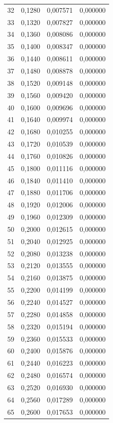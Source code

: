 \begin{tabular}{lrrr}
32 & 0,1280 & 0,007571 & 0,000000 \\
33 & 0,1320 & 0,007827 & 0,000000 \\
34 & 0,1360 & 0,008086 & 0,000000 \\
35 & 0,1400 & 0,008347 & 0,000000 \\
36 & 0,1440 & 0,008611 & 0,000000 \\
37 & 0,1480 & 0,008878 & 0,000000 \\
38 & 0,1520 & 0,009148 & 0,000000 \\
39 & 0,1560 & 0,009420 & 0,000000 \\
40 & 0,1600 & 0,009696 & 0,000000 \\
41 & 0,1640 & 0,009974 & 0,000000 \\
42 & 0,1680 & 0,010255 & 0,000000 \\
43 & 0,1720 & 0,010539 & 0,000000 \\
44 & 0,1760 & 0,010826 & 0,000000 \\
45 & 0,1800 & 0,011116 & 0,000000 \\
46 & 0,1840 & 0,011410 & 0,000000 \\
47 & 0,1880 & 0,011706 & 0,000000 \\
48 & 0,1920 & 0,012006 & 0,000000 \\
49 & 0,1960 & 0,012309 & 0,000000 \\
50 & 0,2000 & 0,012615 & 0,000000 \\
51 & 0,2040 & 0,012925 & 0,000000 \\
52 & 0,2080 & 0,013238 & 0,000000 \\
53 & 0,2120 & 0,013555 & 0,000000 \\
54 & 0,2160 & 0,013875 & 0,000000 \\
55 & 0,2200 & 0,014199 & 0,000000 \\
56 & 0,2240 & 0,014527 & 0,000000 \\
57 & 0,2280 & 0,014858 & 0,000000 \\
58 & 0,2320 & 0,015194 & 0,000000 \\
59 & 0,2360 & 0,015533 & 0,000000 \\
60 & 0,2400 & 0,015876 & 0,000000 \\
61 & 0,2440 & 0,016223 & 0,000000 \\
62 & 0,2480 & 0,016574 & 0,000000 \\
63 & 0,2520 & 0,016930 & 0,000000 \\
64 & 0,2560 & 0,017289 & 0,000000 \\
65 & 0,2600 & 0,017653 & 0,000000 \\

\end{tabular}
